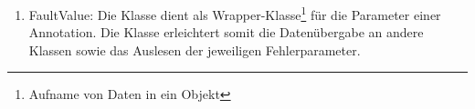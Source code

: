 \begin{enumerate}
	

	\item FaultValue: Die Klasse  dient als Wrapper-Klasse\footnote{Aufname von Daten in ein Objekt} f\"ur die Parameter einer Annotation. Die Klasse erleichtert somit die Datenübergabe an andere Klassen sowie das Auslesen der jeweiligen Fehlerparameter.
\end{enumerate}





